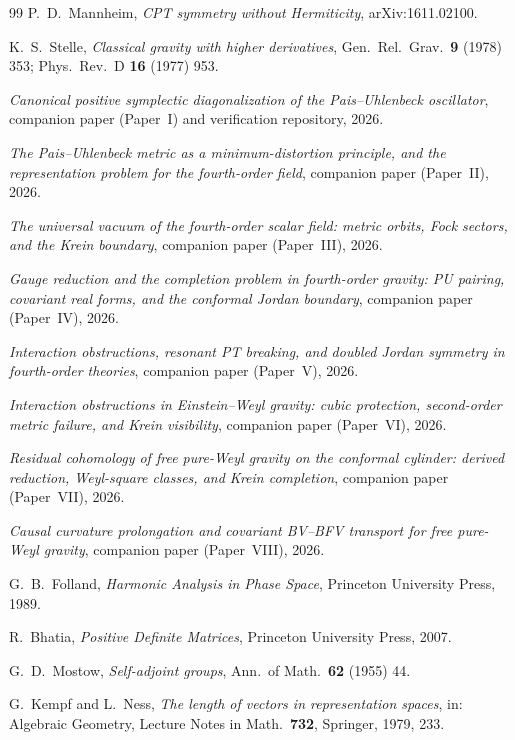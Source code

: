 \documentclass[11pt]{article}
\theoremstyle{remark}
\begin{document}
\begin{thebibliography}{99}
P.~D.~Mannheim,
\emph{CPT symmetry without Hermiticity},
arXiv:1611.02100.

K.~S.~Stelle,
\emph{Classical gravity with higher derivatives},
Gen.\ Rel.\ Grav.\ \textbf{9} (1978) 353;
Phys.\ Rev.\ D \textbf{16} (1977) 953.

\emph{Canonical positive symplectic diagonalization of the
Pais--Uhlenbeck oscillator}, companion paper (Paper~I) and verification
repository, 2026.

\emph{The Pais--Uhlenbeck metric as a minimum-distortion principle, and
the representation problem for the fourth-order field}, companion paper
(Paper~II), 2026.

\emph{The universal vacuum of the fourth-order scalar field: metric
orbits, Fock sectors, and the Krein boundary}, companion paper
(Paper~III), 2026.

\emph{Gauge reduction and the completion problem in fourth-order gravity:
PU pairing, covariant real forms, and the conformal Jordan boundary},
companion paper (Paper~IV), 2026.

\emph{Interaction obstructions, resonant PT breaking, and doubled Jordan
symmetry in fourth-order theories}, companion paper (Paper~V), 2026.

\emph{Interaction obstructions in Einstein--Weyl gravity: cubic
protection, second-order metric failure, and Krein visibility},
companion paper (Paper~VI), 2026.

\emph{Residual cohomology of free pure-Weyl gravity on the conformal
cylinder: derived reduction, Weyl-square classes, and Krein completion},
companion paper (Paper~VII), 2026.

\emph{Causal curvature prolongation and covariant BV--BFV transport for
free pure-Weyl gravity}, companion paper (Paper~VIII), 2026.

G.~B.~Folland,
\emph{Harmonic Analysis in Phase Space},
Princeton University Press, 1989.

R.~Bhatia,
\emph{Positive Definite Matrices},
Princeton University Press, 2007.

G.~D.~Mostow,
\emph{Self-adjoint groups},
Ann.\ of Math.\ \textbf{62} (1955) 44.

G.~Kempf and L.~Ness,
\emph{The length of vectors in representation spaces},
in: Algebraic Geometry, Lecture Notes in Math.\ \textbf{732}, Springer,
1979, 233.


\end{thebibliography}
\end{document}
